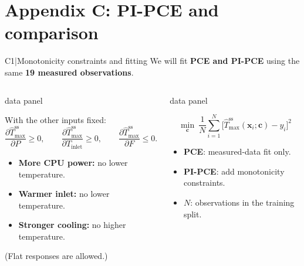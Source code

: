 \section{Appendix C: PI-PCE and comparison}

\renewcommand{\backupcode}{C1}

\begin{frame}[more-space,label=backup-C1]{C1\enspace|\enspace Monotonicity constraints and fitting}
  {\small We will fit \textbf{PCE and PI-PCE} using the same \textbf{19 measured observations}.}
  \medskip
  \begin{columns}[T,onlytextwidth]
      \begin{beamercolorbox}[sep=2mm,wd=\linewidth]{data panel}
        \begin{minipage}[t][40mm][t]{\dimexpr\linewidth-4mm\relax}
          \small
          With the other inputs fixed:
          \[
            \frac{\partial\widehat T_{\max}^{\mathrm{ss}}}{\partial P}\geq0,
            \qquad
            \frac{\partial\widehat T_{\max}^{\mathrm{ss}}}{\partial T_{\mathrm{inlet}}}\geq0,
            \qquad
            \frac{\partial\widehat T_{\max}^{\mathrm{ss}}}{\partial F}\leq0.
          \]
          \begin{itemize}
            \item \textbf{More CPU power:} no lower temperature.
            \item \textbf{Warmer inlet:} no lower temperature.
            \item \textbf{Stronger cooling:} no higher temperature.
          \end{itemize}
          \footnotesize (Flat responses are allowed.)
        \end{minipage}
      \end{beamercolorbox}
      \begin{beamercolorbox}[sep=2mm,wd=\linewidth]{data panel}
        \begin{minipage}[t][40mm][t]{\dimexpr\linewidth-4mm\relax}
          \small
          \[
            \min_{\mathbf c}\ \frac1N\sum_{i=1}^{N}
              \bigl[\widehat T_{\max}^{\mathrm{ss}}(\mathbf x_i;\mathbf c)-y_i\bigr]^2
          \]
          \par
          \raggedright
          \begin{itemize}
            \item \textbf{PCE}: measured-data fit only.
            \item \textbf{PI-PCE}: add monotonicity constraints.
            \item $N$: observations in the training split.
          \end{itemize}
        \end{minipage}
      \end{beamercolorbox}
  \end{columns}
\end{frame}

